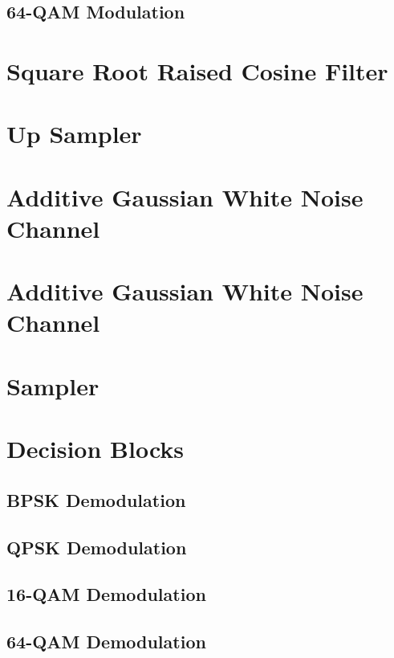 \documentclass[]{article}
\begin{document}
\subsection{64-QAM Modulation }
\label{app:qam_64_mod}

\cleardoublepage  %
\newpage

\section{Square Root Raised Cosine Filter}
\label{app:sqrt_raised_cosine}

\cleardoublepage
\newpage

\section{Up Sampler}
\label{app:impulse_train}

\cleardoublepage
\newpage

\section{Additive Gaussian White Noise Channel}
\label{app:awgn_channel}

\cleardoublepage
\newpage

\section{Additive Gaussian White Noise Channel}
\label{app:awgn_channel}

\cleardoublepage
\newpage

\section{Sampler}
\label{app:sampler}

\cleardoublepage
\newpage

\section{Decision Blocks}
\label{app:dblocks}
\subsection{BPSK Demodulation}
\label{app:bpsk_demod}

\cleardoublepage
\newpage

\subsection{QPSK Demodulation}
\label{app:qpsk_demod}

\cleardoublepage
\newpage

\subsection{16-QAM Demodulation}
\label{app:qam_16_demod}

\cleardoublepage
\newpage

\subsection{64-QAM Demodulation}
\label{app:qam_64_demod}

\cleardoublepage
\newpage
\end{document}
